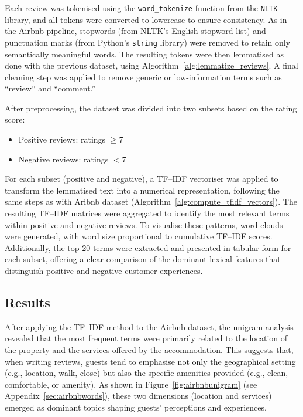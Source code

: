 \documentclass[a4paper, 12pt, twoside]{report}  %
\begin{document}
\indent Each review was tokenised using the \texttt{word\_tokenize} function from the \texttt{NLTK} library, and all tokens were converted to lowercase to ensure consistency. As in the Airbnb pipeline, stopwords (from NLTK’s English stopword list) and punctuation marks (from Python’s \texttt{string} library) were removed to retain only semantically meaningful words. The resulting tokens were then lemmatised as done with the previous dataset, using Algorithm~\ref{alg:lemmatize_reviews}. A final cleaning step was applied to remove generic or low-information terms such as “review” and “comment.”

\indent After preprocessing, the dataset was divided into two subsets based on the rating score:

\begin{itemize}
    \item Positive reviews: ratings $\geq 7$
    \item Negative reviews: ratings $< 7$
\end{itemize}

\indent For each subset (positive and negative), a TF–IDF vectoriser was applied to transform the lemmatised text into a numerical representation, following the same steps as with Aribnb dataset (Algorithm~\ref{alg:compute_tfidf_vectors}). The resulting TF–IDF matrices were aggregated to identify the most relevant terms within positive and negative reviews. To visualise these patterns, word clouds were generated, with word size proportional to cumulative TF–IDF scores. Additionally, the top 20 terms were extracted and presented in tabular form for each subset, offering a clear comparison of the dominant lexical features that distinguish positive and negative customer experiences.

\subsection{Results}

\indent After applying the TF–IDF method to the Airbnb dataset, the unigram analysis revealed that the most frequent terms were primarily related to the location of the property and the services offered by the accommodation. This suggests that, when writing reviews, guests tend to emphasise not only the geographical setting (e.g., location, walk, close) but also the specific amenities provided (e.g., clean, comfortable, or amenity). As shown in Figure~\ref{fig:airbnbunigram} (see Appendix~\ref{sec:airbnbwords}), these two dimensions (location and services) emerged as dominant topics shaping guests’ perceptions and experiences.
\end{document}

